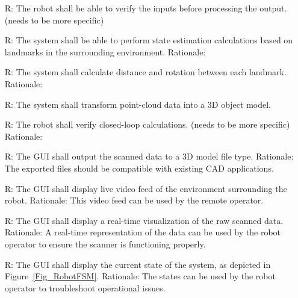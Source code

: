 \documentclass[12pt]{article}
\newcounter{reqnum} %
\begin{document}
\begin{itemize}
\item[R\refstepcounter{reqnum}\thereqnum \label{R_OutputInputs1}:] The robot shall be able to verify the inputs before processing the output. (needs to be more specific)
\item[R\refstepcounter{reqnum}\thereqnum \label{R_Calculate1}:] The system shall be able to perform state estimation calculations based on landmarks in the surrounding environment.
\newline Rationale: 
\item[R\refstepcounter{reqnum}\thereqnum \label{R_Calculate2}:] The system shall calculate distance and rotation between each landmark.
\newline Rationale:
\item[R\refstepcounter{reqnum}\thereqnum \label{R_Calculate2}:] The system shall transform point-cloud data into a 3D object model.

\item[R\refstepcounter{reqnum}\thereqnum \label{R_VerifyOutput}:] The robot shall verify closed-loop calculations. (needs to be more specific)
\newline Rationale:

\item[R\refstepcounter{reqnum}\thereqnum \label{R_Output1}:] The GUI shall output the scanned data to a 3D model file type.
\newline Rationale: The exported files should be compatible with existing CAD applications.
\item[R\refstepcounter{reqnum}\thereqnum \label{R_Output2}:] The GUI shall display live video feed of the environment surrounding  the robot.
Rationale: This video feed can be used by the remote operator.
\item[R\refstepcounter{reqnum}\thereqnum \label{R_Output3}:] The GUI shall display a real-time visualization of the raw scanned data. 
\newline Rationale: A real-time representation of the data can be used by the robot operator to ensure the scanner is functioning properly.
\item[R\refstepcounter{reqnum}\thereqnum \label{R_Output4}:] The GUI shall display the current state of the system, as depicted in Figure~\ref{Fig_RobotFSM}.
\newline Rationale: The states can be used by the robot operator to troubleshoot operational issues.


\end{itemize}
\end{document}
